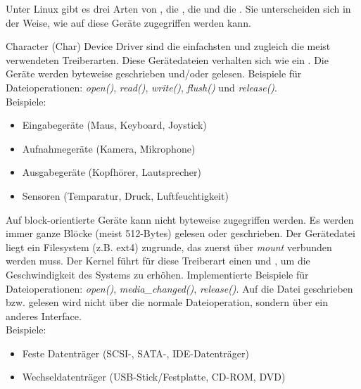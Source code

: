 Unter Linux gibt es drei Arten von , die , die  und die . Sie unterscheiden sich in 
der Weise, wie auf diese Geräte zugegriffen werden kann.
\clearpage
\begin{description}[leftmargin=5cm]
   \item[Char Device Driver]
         Character (Char) Device Driver sind die einfachsten und zugleich die meist verwendeten Treiberarten. Diese Gerätedateien verhalten sich wie ein . Die Geräte werden byteweise
         geschrieben und/oder gelesen. Beispiele für  Dateioperationen: \emph{open()}, \emph{read()}, \emph{write()}, \emph{flush()} und \emph{release()}. \\

         Beispiele:
         \begin{itemize}
            \item Eingabegeräte (Maus, Keyboard, Joystick)
            \item Aufnahmegeräte (Kamera, Mikrophone)
            \item Ausgabegeräte (Kopfhörer, Lautsprecher)
            \item Sensoren (Temparatur, Druck, Luftfeuchtigkeit)
         \end{itemize}

   \item[Block Device Driver]
         Auf block-orientierte Geräte kann nicht byteweise zugegriffen werden. Es werden immer ganze Blöcke (meist 512-Bytes) gelesen oder geschrieben. Der Gerätedatei liegt ein Filesystem (z.B. ext4) zugrunde,
         das zuerst über \emph{mount} verbunden werden muss. Der Kernel führt für diese Treiberart einen  und , um die Geschwindigkeit des Systems zu erhöhen. Implementierte
         Beispiele für Dateioperationen:  \emph{open()}, \emph{media\_changed()}, \emph{release()}. Auf die Datei geschrieben bzw. gelesen wird nicht über die normale Dateioperation, sondern über ein anderes Interface. \\

         Beispiele:
         \begin{itemize}
            \item Feste Datenträger (SCSI-, SATA-, IDE-Datenträger)
            \item Wechseldatenträger (USB-Stick/Festplatte, CD-ROM, DVD)
         \end{itemize}


\end{description}
